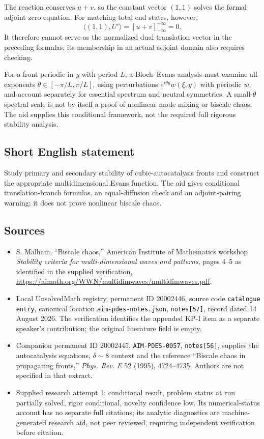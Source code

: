 \documentclass[11pt]{article}
\begin{document}
The reaction conserves $u+v$, so the constant vector $(1,1)$ solves the formal adjoint zero equation. For matching total end states, however,
\[
 \langle(1,1),U'\rangle
  =[u+v]_{-\infty}^{+\infty}=0.
\]
It therefore cannot serve as the normalized dual translation vector in the preceding formulas; its membership in an actual adjoint domain also requires checking.

For a front periodic in $y$ with period $L$, a Bloch--Evans analysis must examine all exponents $\theta\in[-\pi/L,\pi/L]$, using perturbations $e^{i\theta y}w(\xi,y)$ with periodic $w$, and account separately for essential spectrum and neutral symmetries. A small-$\theta$ spectral scale is not by itself a proof of nonlinear mode mixing or biscale chaos. The aid supplies this conditional framework, not the required full rigorous stability analysis.
\subsection{Short English statement}
Study primary and secondary stability of cubic-autocatalysis fronts and construct the appropriate multidimensional Evans function. The aid gives conditional translation-branch formulas, an equal-diffusion check and an adjoint-pairing warning; it does not prove nonlinear biscale chaos.
\subsection{Sources}
\begin{itemize}
\item S. Malham, ``Biscale chaos,'' American Institute of Mathematics workshop \emph{Stability criteria for multi-dimensional waves and patterns}, pages 4--5 as identified in the supplied verification, \url{https://aimath.org/WWN/multidimwaves/multidimwaves.pdf}.
\item Local UnsolvedMath registry, permanent ID 20002446, source code \texttt{catalogue entry}, canonical location \texttt{aim-pdes-notes.json}, \texttt{notes[57]}, record dated 14 August 2026. The verification identifies the appended KP-I item as a separate speaker's contribution; the original literature field is empty.
\item Companion permanent ID 20002445, \texttt{AIM-PDES-0057}, \texttt{notes[56]}, supplies the autocatalysis equations, $\delta\sim8$ context and the reference ``Biscale chaos in propagating fronts,'' \emph{Phys. Rev. E} 52 (1995), 4724--4735. Authors are not specified in that extract.
\item Supplied research attempt 1: conditional result, problem status at run partially solved, rigor conditional, novelty confidence low. Its numerical-status account has no separate full citations; its analytic diagnostics are machine-generated research aid, not peer reviewed, requiring independent verification before citation.
\end{itemize}
\end{document}
